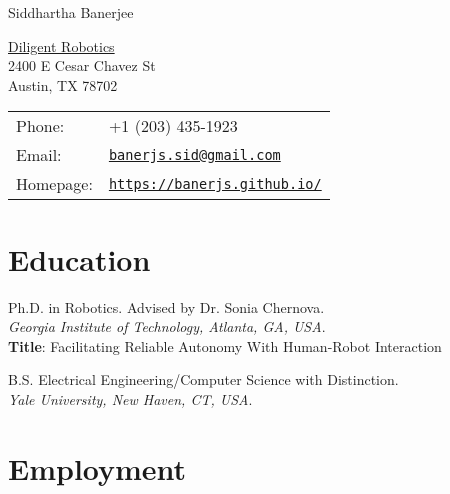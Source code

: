 \documentclass[letterpaper]{article}
\def\name{Siddhartha Banerjee}
\begin{document}
{\huge \name}


\vspace{0.25in}

\begin{minipage}{0.45\linewidth}
  \href{}{Diligent Robotics} \\
  2400 E Cesar Chavez St \\
  Austin, TX 78702
\end{minipage}
\begin{minipage}{0.45\linewidth}
  \begin{tabular}{ll}
    Phone: & +1 (203) 435-1923 \\
    Email: & \href{mailto:banerjs.sid@gmail.com}{\tt banerjs.sid@gmail.com} \\
    Homepage: & \href{https://banerjs.github.io/}{\tt https://banerjs.github.io/} \\
  \end{tabular}
\end{minipage}

\section*{Education}

\begin{description}[leftmargin=7.5em, style=nextline]
  \item[2015 --- 2021] Ph.D. in Robotics. Advised by Dr. Sonia Chernova. \\ \textit{Georgia Institute of Technology, Atlanta, GA, USA}. \\ \textbf{Title}: Facilitating Reliable Autonomy With Human-Robot Interaction

  \item[2009 --- 2013] B.S. Electrical Engineering/Computer Science with Distinction. \\ \textit{Yale University, New Haven, CT, USA}.
\end{description}

\section*{Employment}
\end{document}

